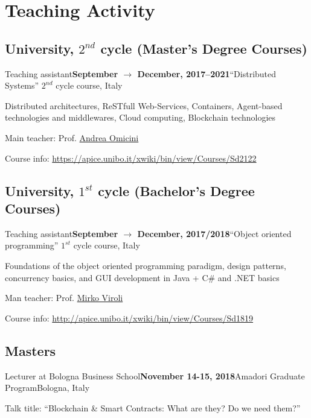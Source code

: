 \section*{Teaching Activity}

\subsection*{University, $2^{nd}$ cycle (Master's Degree Courses)}

\begin{activity}{Teaching assistant}{\textbf{September $\rightarrow$ December, 2017--2021}}{``Distributed Systems'' $2^{nd}$ cycle course}{\uniboen, Italy}
    \item Distributed architectures, ReSTfull Web-Services, Containers,  Agent-based technologies and middlewares, Cloud computing, Blockchain technologies
    \item Main teacher: Prof. \href{mailto:andrea.omicini@unibo.it}{Andrea Omicini}
    \item Course info: \url{https://apice.unibo.it/xwiki/bin/view/Courses/Sd2122}
\end{activity}

\subsection*{University, $1^{st}$ cycle (Bachelor's Degree Courses)}

\begin{activity}{Teaching assistant}{\textbf{September $\rightarrow$ December, 2017/2018}}{``Object oriented programming'' $1^{st}$ cycle course}{\uniboen, Italy}
    \item Foundations of the object oriented programming paradigm, design patterns, concurrency basics, and GUI development in Java + C\# and .NET basics
    \item Man teacher: Prof. \href{mailto:mirko.viroli@unibo.it}{Mirko Viroli}
    \item Course info: \url{http://apice.unibo.it/xwiki/bin/view/Courses/Sd1819}
\end{activity}

\subsection*{Masters}

\begin{activity}{Lecturer at Bologna Business School}{\textbf{November 14-15, 2018}}{Amadori Graduate Program}{Bologna, Italy}
	\item Talk title: ``Blockchain \& Smart Contracts: What are they? Do we need them?''
\end{activity}

